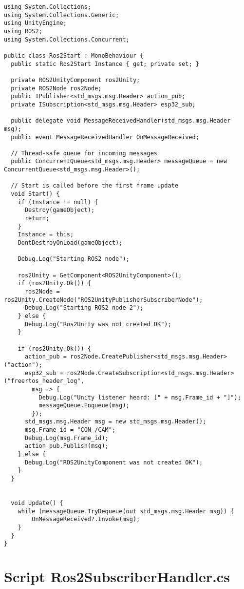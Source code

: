 \begin{lstlisting}[label=lst:Ros2StartCode, caption={Código de Ros2Start}]
using System.Collections;
using System.Collections.Generic;
using UnityEngine;
using ROS2;
using System.Collections.Concurrent;

public class Ros2Start : MonoBehaviour {
  public static Ros2Start Instance { get; private set; }

  private ROS2UnityComponent ros2Unity;
  private ROS2Node ros2Node;
  public IPublisher<std_msgs.msg.Header> action_pub;
  private ISubscription<std_msgs.msg.Header> esp32_sub;

  public delegate void MessageReceivedHandler(std_msgs.msg.Header msg);
  public event MessageReceivedHandler OnMessageReceived;

  // Thread-safe queue for incoming messages
  public ConcurrentQueue<std_msgs.msg.Header> messageQueue = new ConcurrentQueue<std_msgs.msg.Header>();

  // Start is called before the first frame update
  void Start() {
    if (Instance != null) {
      Destroy(gameObject);
      return;
    }
    Instance = this;
    DontDestroyOnLoad(gameObject);

    Debug.Log("Starting ROS2 node");

    ros2Unity = GetComponent<ROS2UnityComponent>();
    if (ros2Unity.Ok()) {
      ros2Node = ros2Unity.CreateNode("ROS2UnityPublisherSubscriberNode");
      Debug.Log("Starting ROS2 node 2");
    } else {
      Debug.Log("Ros2Unity was not created OK");
    }

    if (ros2Unity.Ok()) {
      action_pub = ros2Node.CreatePublisher<std_msgs.msg.Header>("action"); 
      esp32_sub = ros2Node.CreateSubscription<std_msgs.msg.Header>("freertos_header_log", 
        msg => {
          Debug.Log("Unity listener heard: [" + msg.Frame_id + "]");
          messageQueue.Enqueue(msg);
        });
      std_msgs.msg.Header msg = new std_msgs.msg.Header();
      msg.Frame_id = "CON_/CAM";
      Debug.Log(msg.Frame_id);
      action_pub.Publish(msg);
    } else {
      Debug.Log("ROS2UnityComponent was not created OK");
    }
  }


  void Update() {
    while (messageQueue.TryDequeue(out std_msgs.msg.Header msg)) {
        OnMessageReceived?.Invoke(msg);
    }
  }
}
\end{lstlisting}

\section{Script Ros2SubscriberHandler.cs}
\label{appendix:ros2subscriberhandler}

